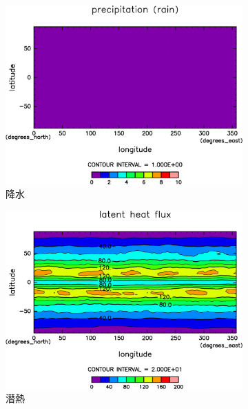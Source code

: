 \documentclass[body]{subfiles}
\begin{document}
\begin{figure}[t]
\begin{subfigure}{.4\textwidth}
		\includegraphics[width=\columnwidth]{S1366/Rain,time=14600:14965-crop-rotate.pdf}
		\caption{降水\hmu*{[W/m^{-2}]}}\label{S1366降水}
	\end{subfigure}
	\begin{subfigure}{.4\textwidth}
		\centering
		\includegraphics[width=\columnwidth]{S1366/Evap,time=14600:14965-crop-rotate.pdf}
		\caption{潜熱\hmu*{[W/m^{-2}]}}\label{S1366潜熱}
	\end{subfigure}
	\begin{subfigure}{.4\textwidth}
		\centering

\end{subfigure}
\end{figure}
\end{document}
